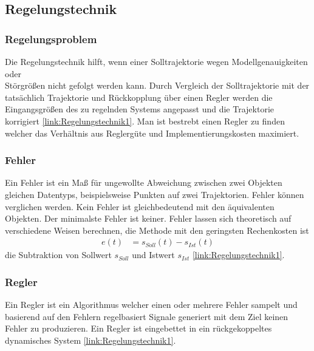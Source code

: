 \subsection{Regelungstechnik}

\subsubsection{Regelungsproblem}
Die Regelungstechnik hilft, wenn einer Solltrajektorie wegen Modellgenauigkeiten oder\\ Störgrößen nicht gefolgt werden kann. Durch Vergleich der Solltrajektorie mit der tatsächlich Trajektorie und Rückkopplung über einen Regler werden die Eingangsgrößen des zu regelnden Systems angepasst und die Trajektorie korrigiert \ref{link:Regelungstechnik1}. Man ist bestrebt einen Regler zu finden welcher das Verhältnis aus Reglergüte und Implementierungskosten maximiert.

\subsubsection{Fehler}
Ein Fehler ist ein Maß für ungewollte Abweichung zwischen zwei Objekten gleichen Datentyps, beispielsweise Punkten auf zwei Trajektorien. Fehler können verglichen werden. Kein Fehler ist gleichbedeutend mit den äquivalenten Objekten. Der minimalste Fehler ist keiner. Fehler lassen sich theoretisch auf verschiedene Weisen berechnen, die Methode mit den geringsten Rechenkosten ist 
\begin{align}
	e(t) &= s_{Soll}(t) - s_{Ist}(t)
\end{align}
die Subtraktion von Sollwert $s_{Soll}$ und Istwert $s_{Ist}$ \ref{link:Regelungstechnik1}.

\subsubsection{Regler}
Ein Regler ist ein Algorithmus welcher einen oder mehrere Fehler sampelt und basierend auf den Fehlern regelbasiert Signale generiert mit dem Ziel keinen Fehler zu produzieren. Ein Regler ist eingebettet in ein rückgekoppeltes dynamisches System \ref{link:Regelungstechnik1}.

